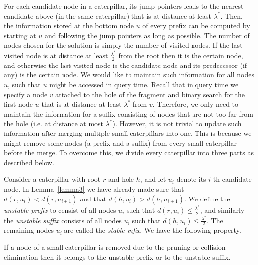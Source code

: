 \documentclass[a4paper,UKenglish]{lipics-v2016}
\theoremstyle{plain}
\begin{document}
\medskip {} For each candidate node in a caterpillar, its jump pointers leads to the nearest
candidate above (in the same caterpillar) that is at distance at least $\lambda^{*}$. Then, the information
stored at the bottom node $u$ of every prefix can be computed by starting at $u$ and following
the jump pointers as long as possible. The number of nodes chosen for the solution is simply the number of visited
nodes. If the last visited node is at distance at least $\frac{\lambda^{*}}{2}$ from the root then it is
the certain node, and otherwise the last visited node is the candidate node and its predecessor
(if any) is the certain node. We would like to maintain such information for all nodes $u$,
such that $u$ might be accessed in query time. Recall that in query time we specify
a node $v$ attached to the hole of the fragment and binary search for the first node $u$ that
is at distance at least $\lambda^{*}$ from $v$. Therefore, we only need to maintain the information
for a suffix consisting of nodes that are not too far from the hole (i.e. at distance at most $\lambda^{*}$). However, it is not
 trivial to update such information after merging multiple small caterpillars into
one. This is because we might remove some nodes (a prefix and a suffix)
from every small caterpillar before the merge. To overcome this, we divide every caterpillar into
three parts as described below.

\medskip {} 


Consider a caterpillar with root $r$ and hole $h$, and let $u_{i}$ denote its $i$-th candidate node. In Lemma~\ref{lemma3} we have already made sure that $d(r,u_{i}) < d(r,u_{i+1})$
and that $d(h,u_{i}) > d(h,u_{i+1})$. We define the \emph{unstable prefix} to
consist of all nodes $u_{i}$ such that $d(r,u_{i})\leq \frac{\lambda^{*}}{2}$, and similarly the
\emph{unstable suffix} consists of all nodes $u_{i}$ such that $d(h,u_{i})\leq \frac{\lambda^{*}}{2}$.
The remaining nodes $u_{i}$ are called the \emph{stable infix}.  We have the following property.

\begin{lemma}
\label{stable infix}
If a node of a small caterpillar is removed due to the pruning or collision elimination then it
belongs to the unstable prefix or to the unstable suffix.
\end{lemma}
\end{document}
